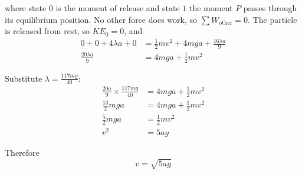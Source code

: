\documentclass[leqno]{article}
\begin{document}
\begin{enumerate}[
  label=\textbf{\arabic*.},
  leftmargin=*,
  topsep=0pt,
  partopsep=0pt,
  parsep=0pt
]
\begin{djsSolution}
\begin{enumerate}[label=\textbf{(\alph*)}, start=1]
where state \(0\) is the moment of release and state \(1\) the moment \(P\) passes through its equilibrium position. No other force does work, so \(\sum W_{\text{other}}=0\). The particle is released from rest, so \(KE_0=0\), and
\begin{align*}
0+0+4\lambda a+0&=\frac12 mv^2+4mga+\frac{16\lambda a}{9}\\
\frac{20\lambda a}{9}&=4mga+\frac12 mv^2
\end{align*}

Substitute $\lambda=\frac{117mg}{40}$:
\begin{align*}
\frac{20a}{9}\times \frac{117mg}{40}&=4mga+\frac12 mv^2\\
\frac{13}{2}mga&=4mga+\frac12 mv^2\\
\frac{5}{2}mga&=\frac12 mv^2\\
v^2&=5ag
\end{align*}

Therefore
\[
v=\sqrt{5ag}
\]
\end{enumerate}
\end{djsSolution}


\newpage

\questionitem


\end{enumerate}
\end{document}
